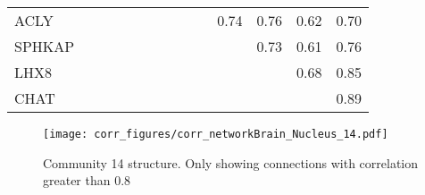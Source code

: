 \begin{longtable}{lrrrrrrrrrrrrr}
ACLY    &             &             &             &              &             &              &               &             &            &         0.74 &       0.76 &       0.62 &          0.70 \\
SPHKAP  &             &             &             &              &             &              &               &             &            &              &       0.73 &       0.61 &          0.76 \\
LHX8    &             &             &             &              &             &              &               &             &            &              &            &       0.68 &          0.85 \\
CHAT    &             &             &             &              &             &              &               &             &            &              &            &            &          0.89 \\
\end{longtable}


\begin{figure}[h!]
\centering
\texttt{[image: corr\_figures/corr\_networkBrain\_Nucleus\_14.pdf]}
\caption{Community 14 structure. Only showing connections with correlation greater than 0.8}
\end{figure}




